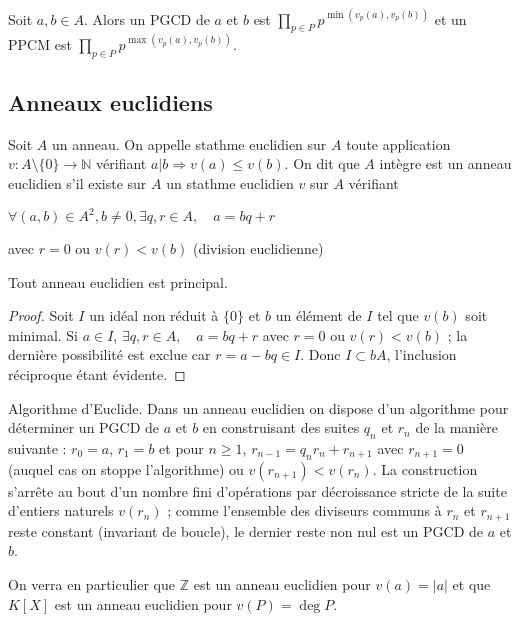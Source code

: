 \begin{prop}
Soit $a,b \in A$. Alors un PGCD de $a$ et $b$ est
$\prod_{p \in P} p^{\min(v_p(a),v_p(b))}$
et un PPCM est $\prod_{p \in P} p^{\max(v_p(a),v_p(b))}$.
\end{prop}

\subsection{Anneaux euclidiens}

\begin{de}
Soit $A$ un anneau. On appelle stathme euclidien sur $A$
toute application $v : A \setminus \{0\} \rightarrow \mathbb{N}$
vérifiant $a | b \Rightarrow v(a) \leq v(b)$. On dit que $A$
intègre est un anneau euclidien s'il existe sur $A$ un stathme euclidien $v$
sur $A$ vérifiant

$\forall (a,b) \in A^2, b \neq 0, \exists q,r \in A, \quad a = bq + r$

avec $r = 0$ ou $v(r) < v(b)$ (division euclidienne)
\end{de}

\begin{thm}
Tout anneau euclidien est principal.
\end{thm}

\begin{proof}
Soit $I$ un idéal non réduit à
$\{0\}$ et $b$ un élément de $I$ tel que $v(b)$
soit minimal. Si $a \in I$, $\exists q,r \in A, \quad a = bq + r$ avec $r = 0$ ou $v(r) < v(b)$ ; la dernière possibilité est exclue car $r = a - bq \in I$. Donc $I \subset bA$,
l'inclusion réciproque étant évidente.
\end{proof}

\begin{rem}
Algorithme d'Euclide. Dans un anneau euclidien on dispose
d'un algorithme pour déterminer un PGCD de $a$ et $b$ en construisant des
suites $q_n$ et $r_n$ de la manière suivante :
$r_0 = a$, $r_1 = b$ et pour $n \geq 1$, $r_{n-1} =
q_n r_n + r_{n+1}$ avec $r_{n+1} = 0$
(auquel cas on stoppe l'algorithme) ou $v(r_{n+1}) <
v(r_n)$. La construction s'arrête au bout d'un nombre fini
d'opérations par décroissance stricte de la suite d'entiers naturels
$v(r_n)$ ; comme l'ensemble des diviseurs communs à $r_n$
et $r_{n+1}$ reste constant (invariant de boucle), le dernier reste
non nul est un PGCD de $a$ et $b$.
\end{rem}

\begin{rem}
On verra en particulier que $\mathbb{Z}$ est un anneau euclidien
pour $v(a) = |a|$ et que $K[X]$ est un anneau
euclidien pour $v(P) = \deg P$.
\end{rem}

